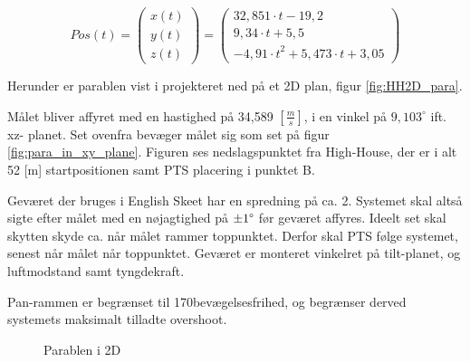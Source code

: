 
\begin{equation}
Pos\left( t \right) = 
\left( \begin{matrix} 
	x\left( t \right)  \\ 
	y\left( t \right)  \\ 
	z\left( t \right)  \end{matrix} \right) =	\left( \begin{matrix}
	32,851\cdot t-19,2 \\
	9,34\cdot t+5,5 \\
	-{ 4,91\cdot t }^{ 2 }+5,473\cdot t+3,05 
 \end{matrix} \right) 
\label{eq:pf:vektorparabel3d}
\end{equation}


Herunder er parablen vist i projekteret ned på et 
2D plan, figur \ref{fig:HH2D_para}.

Målet bliver affyret med en hastighed på 34,589 \([\frac{m}{s}]\), i en vinkel på \(9,103^{\circ}\) ift. xz-
planet. Set ovenfra bevæger målet sig som set på figur \ref{fig:para_in_xy_plane}. 
Figuren ses nedslagspunktet fra High-House, der er i alt 52 [m] startpositionen samt 
PTS placering i punktet B. 

Geværet der bruges i English Skeet har en spredning på ca. 2\degree . Systemet skal altså sigte efter målet med en nøjagtighed på $\pm 1 \degree$ før geværet affyres.
Ideelt set skal skytten skyde ca. når målet rammer toppunktet. 
Derfor skal PTS følge systemet, senest når målet når toppunktet. 
Geværet er monteret vinkelret på tilt-planet, og luftmodstand samt tyngdekraft.

Pan-rammen er begrænset til 170\degree   bevægelsesfrihed, og begrænser derved systemets maksimalt tilladte overshoot.
%
%




\begin{figure}[h!]
\centering
%
\caption[Målets parabel i 2 dimensioner]{Parablen i 2D}
\end{figure}



